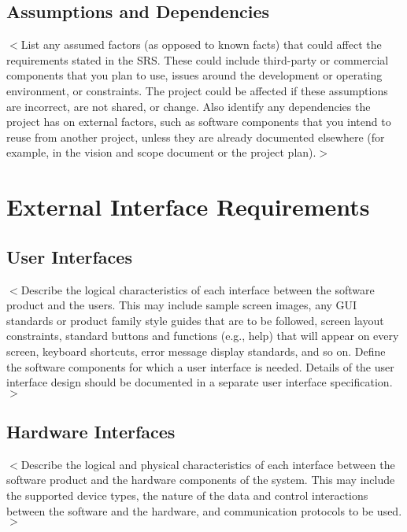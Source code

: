 \documentclass{scrreprt}
\begin{document}
\section{Assumptions and Dependencies}

$<$List any assumed factors (as opposed to known facts) that could affect the
requirements stated in the SRS. These could include third-party or commercial
components that you plan to use, issues around the development or operating
environment, or constraints. The project could be affected if these assumptions
are incorrect, are not shared, or change. Also identify any dependencies the
project has on external factors, such as software components that you intend to
reuse from another project, unless they are already documented elsewhere (for
example, in the vision and scope document or the project plan).$>$


\chapter{External Interface Requirements}

\section{User Interfaces}
$<$Describe the logical characteristics of each interface between the software
product and the users. This may include sample screen images, any GUI standards
or product family style guides that are to be followed, screen layout
constraints, standard buttons and functions (e.g., help) that will appear on
every screen, keyboard shortcuts, error message display standards, and so on.
Define the software components for which a user interface is needed. Details of
the user interface design should be documented in a separate user interface
specification.$>$

\section{Hardware Interfaces}
$<$Describe the logical and physical characteristics of each interface between
the software product and the hardware components of the system. This may include
the supported device types, the nature of the data and control interactions
between the software and the hardware, and communication protocols to be
used.$>$
\end{document}
